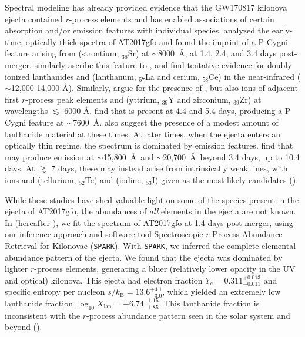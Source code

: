 \documentclass[twocolumn,twocolappendix]{aastex63}
\def\SPARK{\texttt{SPARK}}
\def\V23{\citetalias{vieira23}}
\begin{document}
Spectral modeling has already provided evidence that the GW170817 kilonova ejecta contained $r$-process elements and has enabled associations of certain absorption and/or emission features with individual species. \cite{watson19} analyzed the early-time, optically thick spectra of AT2017gfo and found the imprint of a P Cygni feature arising from  (strontium, ${}_{38}$Sr) at $\sim$8000~\AA, at 1.4, 2.4, and 3.4 days post-merger. \cite{domoto21, domoto22} similarly ascribe this feature to , and find tentative evidence for doubly ionized lanthanides  and  (lanthanum, ${}_{57}$La and cerium, ${}_{58}$Ce) in the near-infrared ($\sim$12,000-14,000 \AA). Similarly, \cite{gillanders22} argue for the presence of , but also ions of adjacent first $r$-process peak elements  and  (yttrium, ${}_{39}$Y and zirconium, ${}_{39}$Zr) at wavelengths $\lesssim$ 6000 \AA. \cite{sneppenwatson23} find that  is present at 4.4 and 5.4 days, producing a P Cygni feature at $\sim$7600~\AA. \cite{gillanders22} also suggest the presence of a modest amount of lanthanide material at these times.  At later times, when the ejecta enters an optically thin regime, the spectrum is dominated by emission features. \cite{gillanders23} find that  may produce emission at $\sim$15,800~\AA~and $\sim$20,700~\AA~beyond 3.4 days, up to 10.4 days. At $\gtrsim$ 7 days, these may instead arise from intrinsically weak lines, with ions  and  (tellurium, ${}_{52}$Te) and  (iodine, ${}_{53}$I) given as the most likely candidates (\citealt{gillanders23, hotokezaka23}). 

While these studies have shed valuable light on some of the species present in the ejecta of AT2017gfo, the abundances of \textit{all} elements in the ejecta are not known. In \cite{vieira23} (hereafter \V23), we fit the spectrum of AT2017gfo at 1.4 days post-merger, using our inference approach and software tool Spectroscopic $r$-Process Abundance Retrieval for Kilonovae (\SPARK). With \SPARK, we inferred the complete elemental abundance pattern of the ejecta. We found that the ejecta was dominated by lighter $r$-process elements, generating a bluer (relatively lower opacity in the UV and optical) kilonova. This ejecta had electron fraction $Y_e = 0.311^{+0.013}_{-0.011}$ and specific entropy per nucleon $s / k_{\mathrm{B}} = 13.6^{+4.1}_{-3.0}$, which yielded an extremely low lanthanide fraction $\log_{10} X_{\mathrm{lan}} = {-6.74}^{+1.15}_{-1.85}$. This lanthanide fraction is inconsistent with the $r$-process abundance pattern seen in the solar system and beyond (\citealt{ji19}). 
\end{document}
